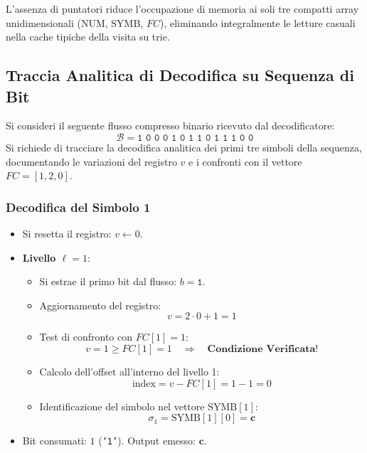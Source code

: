L'assenza di puntatori riduce l'occupazione di memoria ai soli tre compatti array unidimensionali ($\text{NUM}$, $\text{SYMB}$, $FC$), eliminando integralmente le letture casuali nella cache tipiche della visita su trie.

\FloatBarrier
\subsection{Traccia Analitica di Decodifica su Sequenza di Bit}
\label{subsec:traccia-decodifica-bitstream}

Si consideri il seguente flusso compresso binario ricevuto dal decodificatore:
\begin{equation}
  \mathcal{B} = \texttt{1 0 0 0 1 0 1 1 0 1 1 1 0 0}
\end{equation}
Si richiede di tracciare la decodifica analitica dei primi tre simboli della sequenza, documentando le variazioni del registro $v$ e i confronti con il vettore $FC = [1, 2, 0]$.

\subsubsection*{Decodifica del Simbolo 1}
\begin{itemize}
  \item Si resetta il registro: $v \leftarrow 0$.
  \item \textbf{Livello $\ell = 1$}:
  \begin{itemize}
    \item Si estrae il primo bit dal flusso: $b = \texttt{1}$.
    \item Aggiornamento del registro:
    \begin{equation}
      v = 2 \cdot 0 + 1 = 1
    \end{equation}
    \item Test di confronto con $FC[1] = 1$:
    \begin{equation}
      v = 1 \ge FC[1] = 1 \quad \Longrightarrow \quad \textbf{Condizione Verificata!}
    \end{equation}
    \item Calcolo dell'offset all'interno del livello 1:
    \begin{equation}
      \text{index} = v - FC[1] = 1 - 1 = 0
    \end{equation}
    \item Identificazione del simbolo nel vettore $\text{SYMB}[1]$:
    \begin{equation}
      \sigma_1 = \text{SYMB}[1][0] = \mathbf{c}
    \end{equation}
  \end{itemize}
  \item Bit consumati: $1$ (\texttt{'1'}). Output emesso: $\mathbf{c}$.
\end{itemize}


